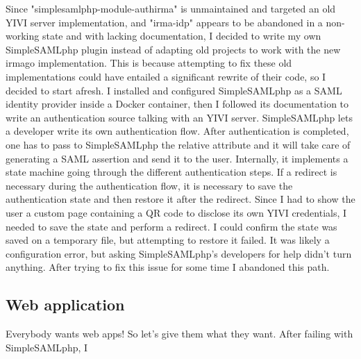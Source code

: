 \documentclass{report}
\begin{document}
Since "simplesamlphp-module-authirma" is unmaintained and targeted an old YIVI server implementation, and "irma-idp" appears to be abandoned in a non-working state and with lacking
documentation, I decided to write my own SimpleSAMLphp plugin instead of adapting old projects to work with the new irmago implementation. This is because attempting to fix these
old implementations could have entailed a significant rewrite of their code, so I decided to start afresh. I installed and configured SimpleSAMLphp \cite{simplesamlphp-docs} as a SAML identity
provider \cite{sstc-saml-core-errata-2.0-wd-07} inside a Docker container, then I followed its documentation to write an authentication source talking with an YIVI server.
SimpleSAMLphp lets a developer write its own authentication flow. After authentication is completed, one has to pass to SimpleSAMLphp the relative attribute and it will take care
of generating a SAML assertion and send it to the user. Internally, it implements a state machine going through the different authentication steps. If a redirect is necessary
during the authentication flow, it is necessary to save the authentication state and then  restore it after the redirect. Since I had to show the user a custom page containing a QR
code to disclose its own YIVI credentials, I needed to save the state and perform a redirect. I could confirm the state was saved on a temporary file, but attempting to restore it
failed. It was likely a configuration error, but asking SimpleSAMLphp's developers for help didn't turn anything. After trying to fix this issue for some time I abandoned this
path.

\iffalse

\subsection{Web application}
Everybody wants web apps! So let's give them what they want. After failing with SimpleSAMLphp, I 
\end{document}
